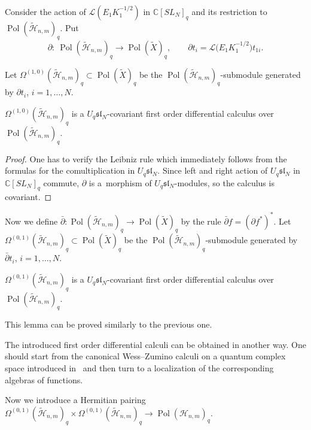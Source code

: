 Consider the action of $\mathcal{L}(E_1K_1^{-1/2})$ in $\mathbb C [SL_N]_q$ and its restriction to
$\operatorname{Pol}(\widetilde{\mathscr{H}}_{n,m})_q$. Put
\[\partial: \
\operatorname{Pol}(\widetilde{\mathscr{H}}_{n,m})_q \rightarrow \operatorname{Pol}(\widetilde{X})_q, \qquad \partial
t_i=\mathcal{L}\big(E_1K_1^{-1/2}\big)t_{1i}.
\]

Let $\Omega^{(1,0)}(\widetilde{\mathscr{H}}_{n,m})_q \subset \operatorname{Pol}(\widetilde{X})_q$ be the
$\operatorname{Pol}(\widetilde{\mathscr{H}}_{n,m})_q$-submodule generated by $\partial t_i$, $i=1,\dots,N$.
\begin{lemma}
$\Omega^{(1,0)}(\widetilde{\mathscr{H}}_{n,m})_q$ is a $U_q \mathfrak{sl}_N$-covariant first order differential calculus
over $\operatorname{Pol}(\widetilde{\mathscr{H}}_{n,m})_q$.
\end{lemma}
\begin{proof} One has to verify the Leibniz rule  which immediately follows from the formulas for the
comultiplication in $U_q \mathfrak{sl}_N$. Since left and right action of $U_q \mathfrak{sl}_N$ in $\mathbb C
[SL_N]_q$ commute, $\partial$ is a~morphism of $U_q \mathfrak{sl}_N$-modules, so the calculus is covariant.
\end{proof}

Now we def\/ine $\bar{\partial}: \operatorname{Pol}(\widetilde{\mathscr{H}}_{n,m})_q \rightarrow
\operatorname{Pol}(\widetilde{X})_q$ by the rule $\bar{\partial}f=(\partial f^*)^*$. Let
$\Omega^{(0,1)}(\widetilde{\mathscr{H}}_{n,m})_q \subset \operatorname{Pol}(\widetilde{X})_q$ be the
$\operatorname{Pol}(\widetilde{\mathscr{H}}_{n,m})_q$-submodule generated by $\bar{\partial} t_i$, $i=1,\dots,N$.
\begin{lemma}
$\Omega^{(0,1)}(\widetilde{\mathscr{H}}_{n,m})_q$ is a $U_q \mathfrak{sl}_N$-covariant first order differential calculus
over $\operatorname{Pol}(\widetilde{\mathscr{H}}_{n,m})_q$.
\end{lemma}

This lemma can be proved similarly to the previous one.
\begin{remark}
The introduced f\/irst order dif\/ferential calculi can be obtained in another
way. One should start from the canonical Wess--Zumino calculi on a quantum
complex space introduced in~\cite{RTF} and then turn to a localization of
the corresponding algebras of functions.
\end{remark}



Now we introduce a Hermitian pairing $\Omega^{(0,1)}(\widetilde{\mathscr{H}}_{n,m})_q \times
\Omega^{(0,1)}(\widetilde{\mathscr{H}}_{n,m})_q \rightarrow \operatorname{Pol}({\mathscr{H}}_{n,m})_q$.

